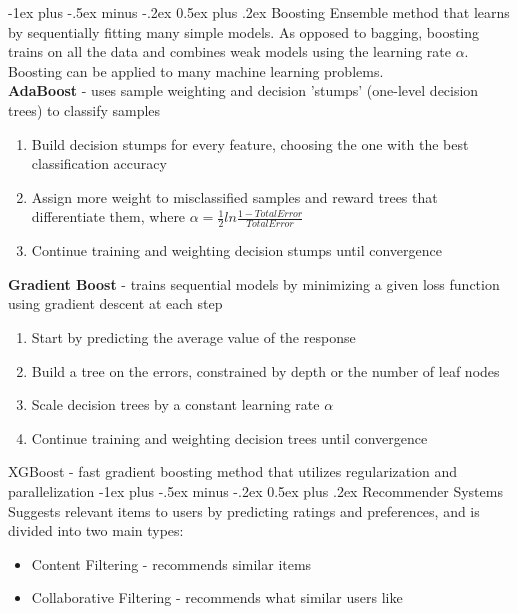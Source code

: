 \documentclass[10pt,landscape]{article}
\makeatletter
\renewcommand{\section}{\@startsection{section}{1}{0mm}%
                                {-1ex plus -.5ex minus -.2ex}%
                                {0.5ex plus .2ex}%
                                {\normalfont\large\bfseries}}
\makeatother
\begin{document}
\begin{multicols}{3}
\section{Boosting} 
Ensemble method that learns by sequentially fitting many simple models. As opposed to bagging, boosting trains on all the data and combines weak models using the learning rate $\alpha$. Boosting can be applied to many machine learning problems.\\
\smallskip
\textbf{AdaBoost} - uses sample weighting and decision 'stumps' (one-level decision trees) to classify samples
\begin{enumerate}[leftmargin=5mm]
\itemsep -.4mm 
\item Build decision stumps for every feature, choosing the one with the best classification accuracy
\item Assign more weight to misclassified samples and reward trees that differentiate them, where  $\alpha = \frac{1}{2}ln\frac{1-TotalError}{TotalError}$
\item Continue training and weighting decision stumps until convergence
\end{enumerate}

\textbf{Gradient Boost} - trains sequential models by minimizing a given loss function using gradient descent at each step
\begin{enumerate}[leftmargin=5mm]
\itemsep -.4mm 
\item Start by predicting the average value of the response 
\item Build a tree on the errors, constrained by depth or the number of leaf nodes
\item Scale decision trees by a constant learning rate $\alpha$ 
\item Continue training and weighting decision trees until convergence
\end{enumerate}

XGBoost - fast gradient boosting method that utilizes regularization and parallelization
\section{Recommender Systems}
Suggests relevant items to users by predicting ratings and preferences, and is divided into two main types:
\begin{itemize}[label={--},leftmargin=4mm]
\itemsep -.4mm 
\item Content Filtering - recommends similar items 
\item Collaborative Filtering - recommends what similar users like 
\end{itemize}


\end{multicols}
\end{document}
